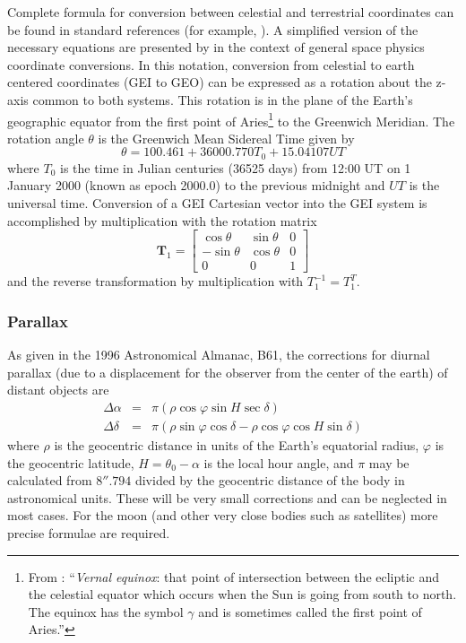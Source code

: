 \documentclass[11pt,twoside]{article}   %
\begin{document}
Complete formula for conversion between celestial and terrestrial
coordinates can be found in standard references (for example,
\cite{lang_1980}). A simplified version of the necessary equations
are presented by \cite{hapgood_1992} in the context of general
space physics coordinate conversions. In this notation, conversion
from celestial to earth centered coordinates (GEI to GEO) can be
expressed as a rotation about the z-axis common to both systems.
This rotation is in the plane of the Earth's geographic equator
from the first point of Aries\footnote{From \cite{lang_1980}:
``{\it Vernal equinox}: that point of intersection between the
ecliptic and the celestial equator which occurs when the Sun is
going from south to north. The equinox has the symbol $\gamma$ and
is sometimes called the first point of Aries.''}
%
to the Greenwich Meridian. The rotation angle $\theta$ is the
Greenwich Mean Sidereal Time given by
 \begin{equation}
  \theta = 100.461 + 36000.770 T_0 + 15.04107 UT
 \end{equation}
where $T_0$ is the time in Julian centuries (36525 days) from
12:00 UT on 1 January 2000 (known as epoch 2000.0) to the previous
midnight and $UT$ is the universal time.  Conversion of a GEI
Cartesian vector into the GEI system is accomplished by
multiplication with the rotation matrix
 \begin{equation}
 {\mathbf T_1} = \left[
 \begin{array}{ccc}
  \cos\theta & \sin\theta & 0 \\
  -\sin\theta & \cos\theta & 0 \\
  0 & 0 & 1
 \end{array}
 \right]
 \end{equation}
and the reverse transformation by multiplication with $T_1^{-1} =
T_1^T$.



 \subsubsection{Parallax}
 \label{sec:parallax}

As given in the 1996 Astronomical Almanac, B61, the corrections
for diurnal parallax (due to a displacement for the observer from
the center of the earth) of distant objects are
 \begin{eqnarray}
  \Delta\alpha &=& \pi (\rho \cos\varphi \sin H \sec\delta) \\
  \Delta\delta &=& \pi (\rho\sin\varphi\cos\delta - \rho\cos\varphi\cos H \sin\delta)
 \end{eqnarray}
where $\rho$ is the geocentric distance in units of the Earth's
equatorial radius, $\varphi$ is the geocentric latitude, $H=
\theta_0 - \alpha$ is the local hour angle, and $\pi$ may be
calculated from $8''.794$ divided by the geocentric distance of
the body in astronomical units.  These will be very small
corrections and can be neglected in most cases.  For the moon (and
other very close bodies such as satellites) more precise formulae
are required.
\end{document}
